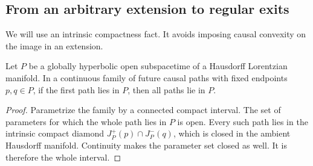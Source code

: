 \subsection{From an arbitrary extension to regular exits}

We will use an intrinsic compactness fact. It avoids imposing causal
convexity on the image in an extension.

\begin{lemma}\label{cat:homotopy}
Let \(P\) be a globally hyperbolic open subspacetime of a Hausdorff
Lorentzian manifold. In a continuous family of future causal paths
with fixed endpoints \(p,q\in P\), if the first path lies in \(P\),
then all paths lie in \(P\).
\end{lemma}
\begin{proof}
Parametrize the family by a connected compact interval. The set of
parameters for which the whole path lies in \(P\) is open. Every
such path lies in the intrinsic compact diamond
\(J_P^+(p)\cap J_P^-(q)\), which is closed in the ambient Hausdorff
manifold. Continuity makes the parameter set closed as well. It is
therefore the whole interval.
\end{proof}

